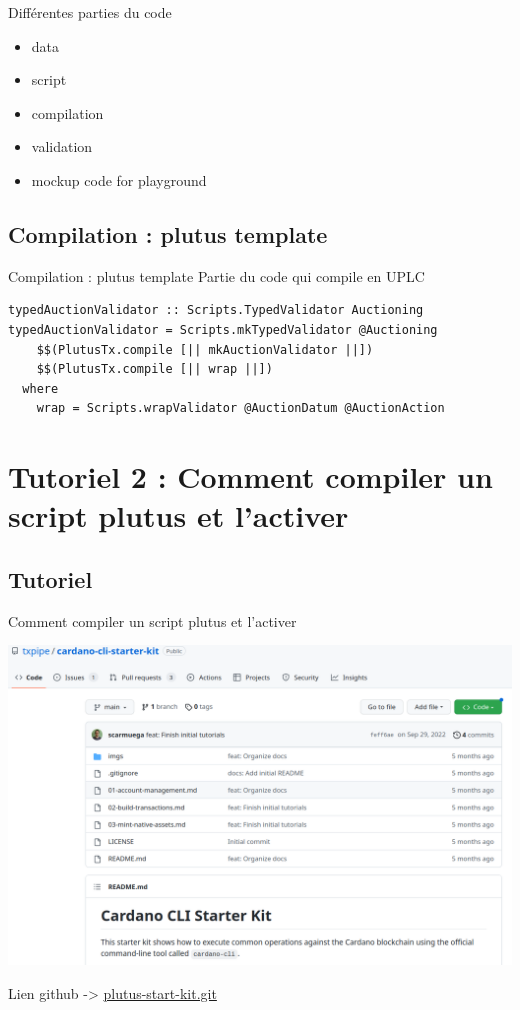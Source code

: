 \documentclass[presentation]{beamer}
\begin{document}
\begin{frame}[label={sec:org28c84cf}]{}
\begin{block}{Différentes parties du code}
\begin{itemize}
\item data
\item script
\item compilation
\item validation
\item mockup code for playground
\end{itemize}
\end{block}
\end{frame}

\subsection{Compilation  : plutus template}
\label{sec:orgf83eb87}
\begin{frame}[label={sec:orga8277a0},fragile]{Compilation  : plutus template}
 Partie du code qui compile en UPLC
\begin{verbatim}
typedAuctionValidator :: Scripts.TypedValidator Auctioning
typedAuctionValidator = Scripts.mkTypedValidator @Auctioning
    $$(PlutusTx.compile [|| mkAuctionValidator ||])
    $$(PlutusTx.compile [|| wrap ||])
  where
    wrap = Scripts.wrapValidator @AuctionDatum @AuctionAction

\end{verbatim}
\end{frame}

\section{Tutoriel 2 : Comment compiler un script plutus et l'activer}
\label{sec:org7ddf95e}
\subsection{Tutoriel}
\label{sec:org15c2fb8}
\begin{frame}[label={sec:org1f886f8}]{Comment compiler un script plutus et l'activer}
      \begin{center}
\includegraphics[height=.7\textheight]{Images/tuto_cardano_cli.png}
\end{center}
Lien github -> \href{https://github.com/txpipe/plutus-starter-kit}{plutus-start-kit.git}
\end{frame}
\end{document}
